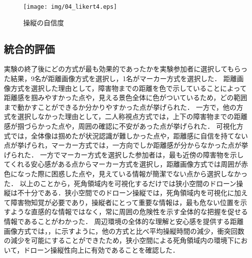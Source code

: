 \documentclass[submit, sigrecommended]{ipsj}
\begin{document}

\begin{figure}[tb]
\centering
\texttt{[image: img/04\_likert4.eps]}
\caption{操縦の自信度}
\label{fig:04_likert4}
\end{figure}


\subsection{統合的評価}
実験の終了後にどの方式が最も効果的であったかを実験参加者に選択してもらった結果，9名が距離画像方式を選択し，1名がマーカー方式を選択した．
距離画像方式を選択した理由として，障害物までの距離を色で示していることによって距離感を掴みやすかった点や，見える景色全体に色がついているため，どの範囲まで動かすことができるか分かりやすかった点が挙げられた．
一方で，他の方式を選択しなかった理由として，二人称視点方式では，上下の障害物までの距離感が掴づらかった点や，周囲の確認に不安があった点が挙げられた．
可視化方式では，全体像は掴めたが状況認識が難しかった点や，距離感に自信を持てない点が挙げられ，マーカー方式では，一方向でしか距離感が分からなかった点が挙げられた．
一方でマーカー方式を選択した参加者は，最も近傍の障害物を示してくれる安心感がある点からマーカー方式を選択し，距離画像方式では周囲が赤色になった際に困惑した点や，見えている情報が簡潔でない点から選択しなかった．
以上のことから，死角領域内を可視化するだけでは狭小空間のドローン操縦は不十分である．狭小空間でのドローン操縦では，死角領域内を可視化に加えて障害物知覚が必要であり，操縦者にとって重要な情報は，最も危ない位置を示すような直感的な情報ではなく，常に周囲の危険性を示す全体的な把握を促せる情報であることがわかった．
周辺環境の全体的な理解と安心感を提供する距離画像方式では，，に示すように，他の方式と比べ平均操縦時間の減少，衝突回数の減少を可能にすることができたため，狭小空間による死角領域内の環境下において，ドローン操縦性向上に有効であることを確認した．

\end{document}
